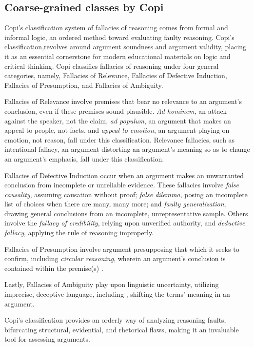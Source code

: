 \subsection{Coarse-grained classes by Copi}
Copi’s \cite{1CopiIrving} classification system of fallacies of reasoning comes from formal and informal logic, an ordered method toward evaluating faulty reasoning. Copi’s classification,revolves around argument soundness and argument validity, placing it as an essential cornerstone for modern educational materials on logic and critical thinking. Copi classifies fallacies of reasoning under four general categories, namely, Fallacies of Relevance, Fallacies of Defective Induction, Fallacies of Presumption, and Fallacies of Ambiguity.  
\par
Fallacies of Relevance involve premises that bear no relevance to an argument’s conclusion, even if these premises sound plausible. \textit{Ad hominem}, an attack against the speaker, not the claim, \textit{ad populum}, an argument that makes an appeal to people, not facts, and \textit{appeal to emotion}, an argument playing on emotion, not reason, fall under this classification. Relevance fallacies, such as intentional fallacy, an argument distorting an argument’s meaning so as to change an argument’s emphasis, fall under this classification.  
\par
Fallacies of Defective Induction occur when an argument makes an unwarranted conclusion from incomplete or unreliable evidence. These fallacies involve \textit{false causality}, assuming causation without proof; \textit{false dilemma}, posing an incomplete list of choices when there are many, many more; and \textit{faulty generalization}, drawing general conclusions from an incomplete, unrepresentative sample. Others involve the \textit{fallacy of credibility}, relying upon unverified authority, and \textit{deductive fallacy}, applying the rule of reasoning improperly.  
\par
Fallacies of Presumption involve argument presupposing that which it seeks to confirm, including \textit{circular reasoning}, wherein an argument’s conclusion is contained within the premise(s) .  
\par
Lastly, Fallacies of Ambiguity play upon linguistic uncertainty, utilizing imprecise, deceptive language, including , shifting the terms' meaning in an argument.  
\par
Copi’s classification provides an orderly way of analyzing reasoning faults, bifurcating structural, evidential, and rhetorical flaws, making it an invaluable tool for assessing arguments.

